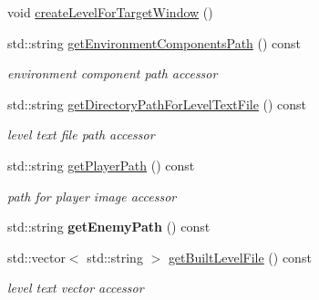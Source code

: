 \begin{DoxyCompactItemize}
void \hyperlink{class_pre_built_level_ac55f77e0ee464325cdd3ffa91292b0c8}{create\+Level\+For\+Target\+Window} ()
\item 
\hypertarget{class_pre_built_level_a9dad873a97adcdaf295fab180e121432}{}\label{class_pre_built_level_a9dad873a97adcdaf295fab180e121432} 
std\+::string \hyperlink{class_pre_built_level_a9dad873a97adcdaf295fab180e121432}{get\+Environment\+Components\+Path} () const
\begin{DoxyCompactList}\small\item\em environment component path accessor \end{DoxyCompactList}\item 
\hypertarget{class_pre_built_level_a71f044fcb4e420d230ec08fb99f052b7}{}\label{class_pre_built_level_a71f044fcb4e420d230ec08fb99f052b7} 
std\+::string \hyperlink{class_pre_built_level_a71f044fcb4e420d230ec08fb99f052b7}{get\+Directory\+Path\+For\+Level\+Text\+File} () const
\begin{DoxyCompactList}\small\item\em level text file path accessor \end{DoxyCompactList}\item 
\hypertarget{class_pre_built_level_a521829d7ce603cca33415de35cf848ea}{}\label{class_pre_built_level_a521829d7ce603cca33415de35cf848ea} 
std\+::string \hyperlink{class_pre_built_level_a521829d7ce603cca33415de35cf848ea}{get\+Player\+Path} () const
\begin{DoxyCompactList}\small\item\em path for player image accessor \end{DoxyCompactList}\item 
\hypertarget{class_pre_built_level_acbde88b4ef5e5c62612baa33d0940aa4}{}\label{class_pre_built_level_acbde88b4ef5e5c62612baa33d0940aa4} 
std\+::string {\bfseries get\+Enemy\+Path} () const
\item 
\hypertarget{class_pre_built_level_a5c7c3ad889ff5eab0cfb367945523d6b}{}\label{class_pre_built_level_a5c7c3ad889ff5eab0cfb367945523d6b} 
std\+::vector$<$ std\+::string $>$ \hyperlink{class_pre_built_level_a5c7c3ad889ff5eab0cfb367945523d6b}{get\+Built\+Level\+File} () const
\begin{DoxyCompactList}\small\item\em level text vector accessor \end{DoxyCompactList}\item 
\hypertarget{class_pre_built_level_ab00f1496cbd95f85dd9471539a7525a9}{}\label{class_pre_built_level_ab00f1496cbd95f85dd9471539a7525a9} 

\end{DoxyCompactItemize}

